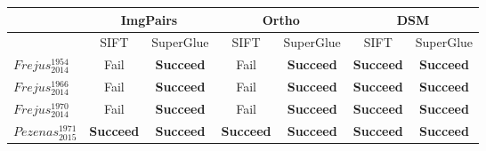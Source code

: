 \begin{table}[htbp]
	\scriptsize %
	\centering
	\begin{tabular}{||l|c|c|c|c|c|c||}\hline
		&\multicolumn{2}{c|}{ImgPairs} &\multicolumn{2}{c|}{Ortho} &\multicolumn{2}{c|}{DSM}\\\hline
		& SIFT & SuperGlue & SIFT & SuperGlue & SIFT & SuperGlue \\\hline\hline
$Frejus_{2014}^{1954}$ &  Fail  &  \textbf{Succeed}  &  Fail  &  \textbf{Succeed}  &  \textbf{Succeed}  &  \textbf{Succeed} \\
$Frejus_{2014}^{1966}$ &  Fail  &  \textbf{Succeed}  &  Fail  &  \textbf{Succeed}  &  \textbf{Succeed}  &  \textbf{Succeed} \\
$Frejus_{2014}^{1970}$ &  Fail  &  \textbf{Succeed}  &  Fail  &  \textbf{Succeed}  &  \textbf{Succeed}  &  \textbf{Succeed} \\\hline
$Pezenas_{2015}^{1971}$ &  \textbf{Succeed}  &  \textbf{Succeed}  &  \textbf{Succeed}  &  \textbf{Succeed}  &  \textbf{Succeed}  &  \textbf{Succeed} \\

\end{tabular}
\end{table}
